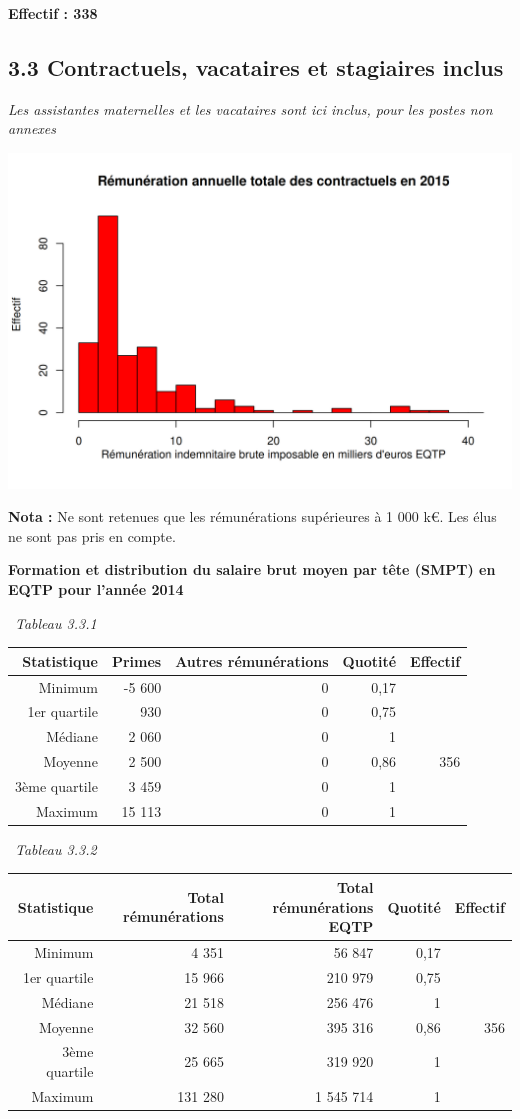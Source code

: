 \textbf{Effectif : 338 }

\hypertarget{contractuels-vacataires-et-stagiaires-inclus-1}{%
\subsection{3.3 Contractuels, vacataires et stagiaires
inclus}\label{contractuels-vacataires-et-stagiaires-inclus-1}}

\emph{Les assistantes maternelles et les vacataires sont ici inclus,
pour les postes non annexes}

\includegraphics{altair_files/figure-latex/unnamed-chunk-94-1.png}

\textbf{Nota :} Ne sont retenues que les rémunérations supérieures à 1
000 k€. Les élus ne sont pas pris en compte.

\textbf{Formation et distribution du salaire brut moyen par tête (SMPT)
en EQTP pour l'année 2014 }

~\emph{Tableau 3.3.1}

\begin{longtable}[]{@{}rrrrr@{}}
\toprule
Statistique & Primes & Autres rémunérations & Quotité &
Effectif\tabularnewline
\midrule
\endhead
Minimum & -5 600 & 0 & 0,17 &\tabularnewline
1er quartile & 930 & 0 & 0,75 &\tabularnewline
Médiane & 2 060 & 0 & 1 &\tabularnewline
Moyenne & 2 500 & 0 & 0,86 & 356\tabularnewline
3ème quartile & 3 459 & 0 & 1 &\tabularnewline
Maximum & 15 113 & 0 & 1 &\tabularnewline
\bottomrule
\end{longtable}

~\emph{Tableau 3.3.2}

\begin{longtable}[]{@{}rrrrr@{}}
\toprule
Statistique & Total rémunérations & Total rémunérations EQTP & Quotité &
Effectif\tabularnewline
\midrule
\endhead
Minimum & 4 351 & 56 847 & 0,17 &\tabularnewline
1er quartile & 15 966 & 210 979 & 0,75 &\tabularnewline
Médiane & 21 518 & 256 476 & 1 &\tabularnewline
Moyenne & 32 560 & 395 316 & 0,86 & 356\tabularnewline
3ème quartile & 25 665 & 319 920 & 1 &\tabularnewline
Maximum & 131 280 & 1 545 714 & 1 &\tabularnewline
\bottomrule
\end{longtable}


